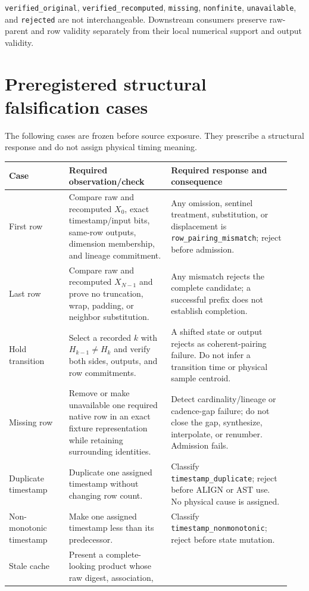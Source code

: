\documentclass[11pt]{article}
\newcommand{\code}[1]{\texttt{#1}}
\begin{document}
\code{verified\_original}, \code{verified\_recomputed}, \code{missing},
\code{nonfinite}, \code{unavailable}, and \code{rejected} are not
interchangeable.  Downstream consumers preserve raw-parent and row validity
separately from their local numerical support and output validity.

\section{Preregistered structural falsification cases}

The following cases are frozen before source exposure.  They prescribe a
structural response and do not assign physical timing meaning.

\begin{longtable}{@{}L{0.20\linewidth}L{0.34\linewidth}L{0.40\linewidth}@{}}
\toprule
Case & Required observation/check & Required response and consequence \\
\midrule
\endhead
First row & Compare raw and recomputed $X_0$, exact timestamp/input bits,
same-row outputs, dimension membership, and lineage commitment. & Any omission,
sentinel treatment, substitution, or displacement is
\code{row\_pairing\_mismatch}; reject before admission. \\
Last row & Compare raw and recomputed $X_{N-1}$ and prove no truncation,
wrap, padding, or neighbor substitution. & Any mismatch rejects the complete
candidate; a successful prefix does not establish completion. \\
Hold transition & Select a recorded $k$ with $H_{k-1}\ne H_k$ and verify both
sides, outputs, and row commitments. & A shifted state or output rejects as
coherent-pairing failure.  Do not infer a transition time or physical sample
centroid. \\
Missing row & Remove or make unavailable one required native row in an exact
fixture representation while retaining surrounding identities. & Detect
cardinality/lineage or cadence-gap failure; do not close the gap, synthesize,
interpolate, or renumber.  Admission fails. \\
Duplicate timestamp & Duplicate one assigned timestamp without changing row
count. & Classify \code{timestamp\_duplicate}; reject before ALIGN or AST use.
No physical cause is assigned. \\
Non-monotonic timestamp & Make one assigned timestamp less than its predecessor.
& Classify \code{timestamp\_nonmonotonic}; reject before state mutation. \\
Stale cache & Present a complete-looking product whose raw digest, association,

\end{longtable}
\end{document}
